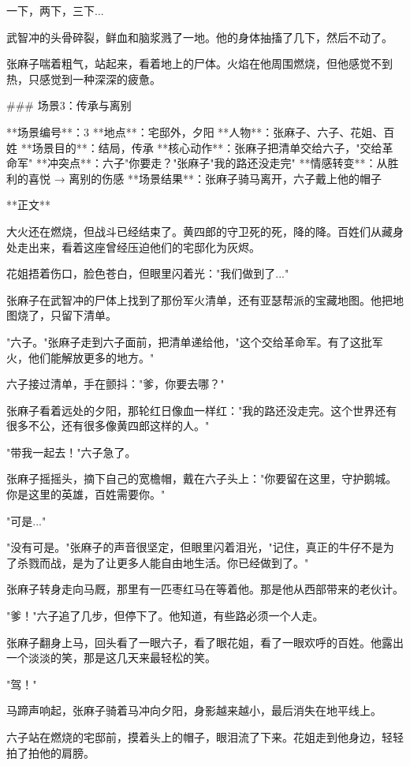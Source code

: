 一下，两下，三下...

武智冲的头骨碎裂，鲜血和脑浆溅了一地。他的身体抽搐了几下，然后不动了。

张麻子喘着粗气，站起来，看着地上的尸体。火焰在他周围燃烧，但他感觉不到热，只感觉到一种深深的疲惫。

### 场景3：传承与离别

**场景编号**：3  
**地点**：宅邸外，夕阳  
**人物**：张麻子、六子、花姐、百姓  
**场景目的**：结局，传承  
**核心动作**：张麻子把清单交给六子，"交给革命军"  
**冲突点**：六子"你要走？"张麻子"我的路还没走完"  
**情感转变**：从胜利的喜悦 → 离别的伤感  
**场景结果**：张麻子骑马离开，六子戴上他的帽子

**正文**

大火还在燃烧，但战斗已经结束了。黄四郎的守卫死的死，降的降。百姓们从藏身处走出来，看着这座曾经压迫他们的宅邸化为灰烬。

花姐捂着伤口，脸色苍白，但眼里闪着光："我们做到了..."

张麻子在武智冲的尸体上找到了那份军火清单，还有亚瑟帮派的宝藏地图。他把地图烧了，只留下清单。

"六子。"张麻子走到六子面前，把清单递给他，"这个交给革命军。有了这批军火，他们能解放更多的地方。"

六子接过清单，手在颤抖："爹，你要去哪？"

张麻子看着远处的夕阳，那轮红日像血一样红："我的路还没走完。这个世界还有很多不公，还有很多像黄四郎这样的人。"

"带我一起去！"六子急了。

张麻子摇摇头，摘下自己的宽檐帽，戴在六子头上："你要留在这里，守护鹅城。你是这里的英雄，百姓需要你。"

"可是..."

"没有可是。"张麻子的声音很坚定，但眼里闪着泪光，"记住，真正的牛仔不是为了杀戮而战，是为了让更多人能自由地生活。你已经做到了。"

张麻子转身走向马厩，那里有一匹枣红马在等着他。那是他从西部带来的老伙计。

"爹！"六子追了几步，但停下了。他知道，有些路必须一个人走。

张麻子翻身上马，回头看了一眼六子，看了眼花姐，看了一眼欢呼的百姓。他露出一个淡淡的笑，那是这几天来最轻松的笑。

"驾！"

马蹄声响起，张麻子骑着马冲向夕阳，身影越来越小，最后消失在地平线上。

六子站在燃烧的宅邸前，摸着头上的帽子，眼泪流了下来。花姐走到他身边，轻轻拍了拍他的肩膀。

